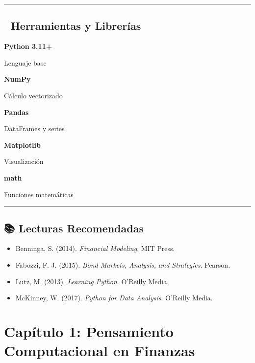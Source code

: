 \documentclass[
  spanish,
  letterpaper,
  DIV=11,
  numbers=noendperiod]{scrreprt}
\providecommand{\tightlist}{%
  \setlength{\itemsep}{0pt}\setlength{\parskip}{0pt}}
\begin{document}
\begin{center}\rule{0.5\linewidth}{0.5pt}\end{center}

\section*{🧰 Herramientas y
Librerías}\label{herramientas-y-libreruxedas}


\textbf{Python 3.11+}

Lenguaje base

\textbf{NumPy}

Cálculo vectorizado

\textbf{Pandas}

DataFrames y series

\textbf{Matplotlib}

Visualización

\textbf{math}

Funciones matemáticas

\begin{center}\rule{0.5\linewidth}{0.5pt}\end{center}

\section*{📚 Lecturas Recomendadas}\label{lecturas-recomendadas}


\begin{itemize}
\tightlist
\item
  Benninga, S. (2014). \emph{Financial Modeling}. MIT Press.
\item
  Fabozzi, F. J. (2015). \emph{Bond Markets, Analysis, and Strategies}.
  Pearson.
\item
  Lutz, M. (2013). \emph{Learning Python}. O'Reilly Media.
\item
  McKinney, W. (2017). \emph{Python for Data Analysis}. O'Reilly Media.
\end{itemize}

\chapter{Capítulo 1: Pensamiento Computacional en
Finanzas}\label{capuxedtulo-1-pensamiento-computacional-en-finanzas}
\end{document}
